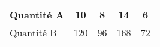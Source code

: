 
\begin{tabular}{|l|c|c|c|c|}
\hline
Quantité A & 10 & 8 & 14 & 6  \\ \hline
Quantité B & 120 & 96 & 168 & 72 \\ \hline
\end{tabular}

